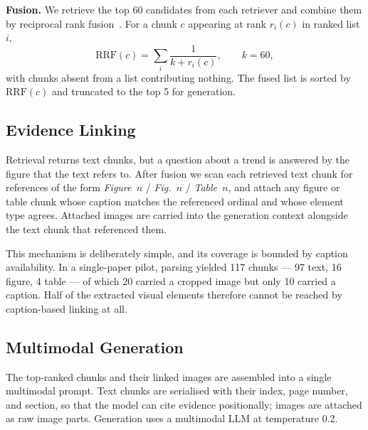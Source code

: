 \documentclass[conference]{IEEEtran}
\newif\ifdraftmode
\newcommand{\TODO}[1]{\ifdraftmode\textcolor{red}{\textbf{[TODO: #1]}}\fi}
\begin{document}
\textbf{Fusion.} We retrieve the top 60 candidates from each retriever and
combine them by reciprocal rank fusion~\cite{cormack2009rrf}. For a chunk $c$
appearing at rank $r_i(c)$ in ranked list $i$,
\begin{equation}
\mathrm{RRF}(c) = \sum_{i} \frac{1}{k + r_i(c)}, \qquad k = 60,
\end{equation}
with chunks absent from a list contributing nothing. The fused list is sorted
by $\mathrm{RRF}(c)$ and truncated to the top 5 for generation.

\subsection{Evidence Linking}
Retrieval returns text chunks, but a question about a trend is answered by the
figure that the text refers to. After fusion we scan each retrieved text chunk
for references of the form \emph{Figure~$n$} / \emph{Fig.~$n$} /
\emph{Table~$n$}, and attach any figure or table chunk whose caption matches
the referenced ordinal and whose element type agrees. Attached images are
carried into the generation context alongside the text chunk that referenced
them.

This mechanism is deliberately simple, and its coverage is bounded by caption
availability. In a single-paper pilot, parsing yielded 117 chunks --- 97 text,
16 figure, 4 table --- of which 20 carried a cropped image but only 10 carried
a caption. Half of the extracted visual elements therefore cannot be reached by
caption-based linking at all.
\TODO{Recompute this statistic across the full annotated corpus. Reported here
from one paper; label it as a pilot number or replace it. Do not let a
single-document count appear in the final paper without that qualification.}

\subsection{Multimodal Generation}
The top-ranked chunks and their linked images are assembled into a single
multimodal prompt. Text chunks are serialised with their index, page number,
and section, so that the model can cite evidence positionally; images are
attached as raw image parts. Generation uses a multimodal LLM at temperature
0.2.
\TODO{Fix the exact model identifier and version string, and verify it against
the provider's model list before submission. The identifier currently in the
codebase should not be copied into the paper unchecked.}
\end{document}
